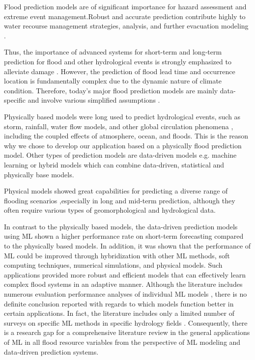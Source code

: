 \documentclass[12pt, a4paper]{report}
\begin{document}
Flood prediction models are of significant importance for hazard assessment and extreme event management.Robust and accurate prediction contribute highly to water recourse management strategies, analysis, and further evacuation modeling \cite{Xie}.
\par

Thus, the importance of advanced systems for short-term and long-term prediction for flood and other hydrological events is strongly emphasized to alleviate damage \cite{Pitt}. However, the prediction of flood lead time and occurrence location is fundamentally complex due to the dynamic nature of climate condition. Therefore, today’s major flood prediction models are mainly data-specific and involve various simplified assumptions \cite{Lohani}. 
\par

Physically based models were long used to predict hydrological events, such as storm, rainfall, water flow models, and other global circulation phenomena , including the coupled effects of atmosphere, ocean, and floods. This is the reason why we chose to develop our application based on a physically flood prediction model. Other types of prediction models are data-driven models e.g. machine learning or hybrid models which can combine data-driven, statistical and physically base models.
\par 

Physical models showed great capabilities for predicting a diverse range of flooding scenarios \cite{Nayak},especially in long and mid-term prediction, although they often require various types of geomorphological and  hydrological data. 
\par 

In contrast to the physically based models, the data-driven prediction models using ML shown a higher performance rate on  short-term forecasting compared to the physically based models. In addition,  it was shown that the performance of ML could be improved through hybridization  with other ML methods, soft computing techniques, numerical simulations, and physical models. Such applications provided more robust and efficient models that can effectively learn complex flood systems in an adaptive manner. Although the literature includes numerous evaluation performance analyses of individual ML models \cite{Taherei, Kasiviswanathan, Ravansalar, Mosavi}, there is no definite conclusion reported with regards to which models function better in certain applications. In fact, the literature includes only a limited number of surveys on specific ML methods in specific hydrology fields \cite{Dandagala, Deka, Fotovatikhah}. Consequently, there is a research gap for a comprehensive literature review in the general applications of ML in all flood resource variables from the perspective of ML modeling and data-driven prediction systems.
\par 
\end{document}
